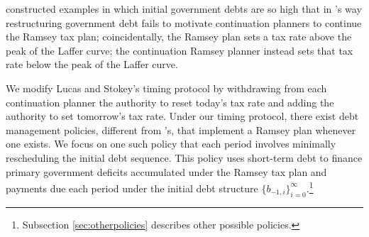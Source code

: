 \documentclass[12pt]{article}
\newcommand{\WJ}[1]{{\textcolor{red}{#1}}}
\begin{document}
	\citet{debortoli2021optimal} constructed examples in which initial government debts are so high that in \citeauthor{LucasStokey1983}'s way restructuring government debt  fails to motivate  continuation planners   to continue the Ramsey tax plan; coincidentally, %
	 the Ramsey plan sets a tax rate above the peak of the Laffer curve; the continuation Ramsey planner instead  sets that tax rate below the  peak of the Laffer curve.
	
%	
%	

We modify Lucas and Stokey's timing protocol  by
withdrawing from each continuation planner the authority to reset today's tax rate and adding the authority to set tomorrow's tax rate. 
Under our timing protocol, there exist  debt management policies,  %
different  from \citeauthor{LucasStokey1983}'s, that implement a Ramsey plan whenever one exists.  
We focus on one such   policy that each period involves minimally  rescheduling the initial debt sequence.  This policy  uses short-term debt to finance  primary government deficits accumulated under the Ramsey tax plan and payments due each period under the   initial debt structure 	 $ \{b_{-1,i}\}_{i=0}^{\infty}$.\footnote{Subsection \ref{sec:otherpolicies} describes other possible policies.}
	
\end{document}
